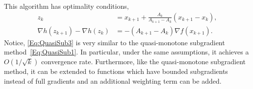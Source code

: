 \documentclass[11pt]{article}
\theoremstyle{plain}
\begin{document}
\noindent This algorithm has optimality conditions,
\begin{subequations}\label{Eq:QuasiSub3}
\begin{align}
z_{k} &= x_{k+1} + \frac{A_{k}}{A_{k+1} -A_{k}} (x_{k+1} - x_k),\label{Eq:ZSeqMethod2}\\%
\nabla h(z_{k+1}) -\nabla h(z_k) &= -(A_{k+1} - A_{k})\nabla f(x_{k+1}).\label{Eq:XSeqMethod2}
\end{align} 
\end{subequations}
Notice, \eqref{Eq:QuasiSub3} is very similar to the quasi-monotone subgradient method~\eqref{Eq:QuasiSub1}. In particular, under the same assumptions, it achieves a $O(1/\sqrt{k})$ convergence rate. Furthermore, like the quasi-monotone subgradient method, it can be extended to functions which have bounded subgradients instead of full gradients and an additional weighting term can be added.

\end{document}
